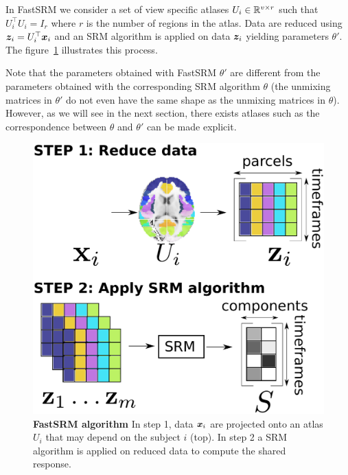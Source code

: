 In FastSRM we consider a set of view specific atlases $U_i \in \mathbb{R}^{v \times r}$ such that
$U_i^{\top}U_i = I_r$ where $r$ is the number of regions in the atlas.
Data are reduced using $\boldsymbol{z}_i = U_i^{\top} \boldsymbol{x}_i$ and an SRM algorithm is applied
on data $\boldsymbol{z}_i$ yielding parameters $\theta'$.
The figure~\ref{fig:srm:conceptual} illustrates this process.

Note that the parameters obtained with FastSRM $\theta'$ are different
from the parameters obtained with the corresponding SRM algorithm $\theta$ (the unmixing matrices in $\theta'$ do not even have the same shape as the unmixing matrices in $\theta$).
However, as we will see in the next section, there exists atlases such as the
correspondence between $\theta$ and
$\theta'$ can be made explicit.

\begin{figure}
  \centering
  \includegraphics[scale=0.34]{figures/srm/conceptual_figure2.pdf}
  \caption{\textbf{FastSRM algorithm} In step 1, data $\boldsymbol{x}_i$ are projected onto an
    atlas $U_i$ that may depend on the subject $i$ (top). In step 2 a SRM algorithm is applied on reduced data to compute the shared response.}
  \label{fig:srm:conceptual}
\end{figure}

